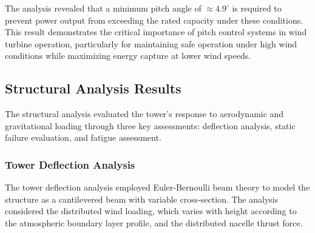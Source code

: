 \documentclass[11pt]{article}
\begin{document}
The analysis revealed that a minimum pitch angle of $\approx 4.9^{\circ}$ is required to prevent power output from exceeding the rated capacity under these conditions.
This result demonstrates the critical importance of pitch control systems in wind turbine operation, particularly for maintaining safe operation under high wind conditions while maximizing energy capture at lower wind speeds. 

\subsection{Structural Analysis Results}

The structural analysis evaluated the tower's response to aerodynamic and gravitational loading through three key assessments: deflection analysis, static failure evaluation, and fatigue assessment.

\subsubsection{Tower Deflection Analysis}

The tower deflection analysis employed Euler-Bernoulli beam theory to model the structure as a cantilevered beam with variable cross-section. The analysis considered the distributed wind loading, which varies with height according to the atmospheric boundary layer profile, and the distributed nacelle thrust force.
\end{document}
